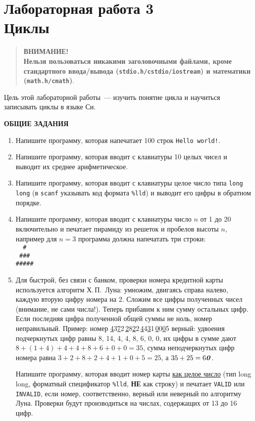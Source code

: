 \documentclass{article}
\begin{document}
\section*{{\normalsize Лабораторная работа 3} \\Циклы}

\begin{quotation}
\hfill\textbf{ВНИМАНИЕ!}\hfill{~}
\\[2mm]
\textbf{Нельзя пользоваться никакими заголовочными файлами, кроме стандартного ввода/вывода (\texttt{stdio.h/cstdio/iostream}) и математики (\texttt{math.h/cmath})}.
\end{quotation}

Цель этой лабораторной работы~--- изучить понятие цикла и научиться записывать циклы в языке Си. 

\bigskip\sloppy
\noindent\centerline{\textbf{ОБЩИЕ ЗАДАНИЯ}}
\begin{enumerate}
\item
Напишите программу, которая напечатает 100 строк \texttt{Hello world!}.
\item 
Напишите программу, которая вводит с клавиатуры 10 целых чисел и выводит их среднее арифметическое.
\item
Напишите программу, которая вводит с клавиатуры целое число типа \texttt{long long} (в \texttt{scanf} указывать код формата \texttt{\%lld}) и выводит его цифры в обратном порядке.
\item
Напишите программу, которая вводит с клавиатуры число $n$ от 1 до 20 включительно и печатает пирамиду из решеток и пробелов высоты $n$, например для $n=3$ программа должна напечатать три строки:\\
\verb!  #!\\
\verb! ###!\\
\verb!#####!
\item
Для быстрой, без связи с банком, проверки номера кредитной карты используется алгоритм Х.\,П.~Луна: умножим, двигаясь справа налево, каждую вторую цифру номера на 2. Сложим все цифры полученных чисел (внимание, не сами числа!). Теперь прибавим к ним сумму остальных цифр. Если последняя цифра полученной общей суммы не ноль, номер неправильный. Пример: номер \underline{4}3\underline{7}2\,\underline{2}8\underline{2}2\,\underline{4}4\underline{3}1\,\underline{0}0\underline{0}5 верный: удвоения подчеркнутых цифр равны 8, 14, 4, 4, 8, 6, 0, 0, их цифры в сумме дают $8 + (1\!+\!4) + 4 + 4+ 8+ 6 + 0+ 0 = 35$, сумма неподчеркнутых цифр номера равна $3+2+8+2+4+1+0+5=25$, а $35+25=6\mbox{\textbf{\textit{0}}}$.

Напишите программу, которая вводит номер карты \underline{как целое число} (тип long long, форматный спецификатор \texttt{\%lld}, \textbf{НЕ} как строку) и печатает \texttt{VALID} или \texttt{INVALID}, если номер, соответственно, верный или неверный по алгоритму Луна. Проверки будут производиться на числах, содержащих от 13 до 16 цифр. 

\end{enumerate}
\end{document}
